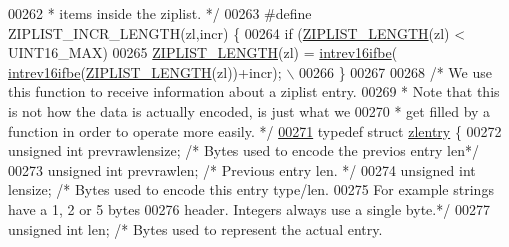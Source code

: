 \begin{DoxyCode}
00262 \textcolor{comment}{ * items inside the ziplist. */}
00263 \textcolor{preprocessor}{#}\textcolor{preprocessor}{define} \textcolor{preprocessor}{ZIPLIST\_INCR\_LENGTH}\textcolor{preprocessor}{(}\textcolor{preprocessor}{zl}\textcolor{preprocessor}{,}\textcolor{preprocessor}{incr}\textcolor{preprocessor}{)} \textcolor{preprocessor}{\{}
00264     \textcolor{keywordflow}{if} \textcolor{preprocessor}{(}\hyperlink{ziplist_8c_a6d779e84aca736e354768fcf87393b98}{ZIPLIST\_LENGTH}\textcolor{preprocessor}{(}\textcolor{preprocessor}{zl}\textcolor{preprocessor}{)} \textcolor{preprocessor}{<} UINT16\_MAX\textcolor{preprocessor}{)}
00265         \hyperlink{ziplist_8c_a6d779e84aca736e354768fcf87393b98}{ZIPLIST\_LENGTH}\textcolor{preprocessor}{(}\textcolor{preprocessor}{zl}\textcolor{preprocessor}{)} \textcolor{preprocessor}{=} \hyperlink{endianconv_8h_a47540b5867d4cb1e322e83eaf2b50b56}{intrev16ifbe}\textcolor{preprocessor}{(}
      \hyperlink{endianconv_8h_a47540b5867d4cb1e322e83eaf2b50b56}{intrev16ifbe}\textcolor{preprocessor}{(}\hyperlink{ziplist_8c_a6d779e84aca736e354768fcf87393b98}{ZIPLIST\_LENGTH}\textcolor{preprocessor}{(}\textcolor{preprocessor}{zl}\textcolor{preprocessor}{)}\textcolor{preprocessor}{)}\textcolor{preprocessor}{+}\textcolor{preprocessor}{incr}\textcolor{preprocessor}{)}\textcolor{preprocessor}{;} \textcolor{preprocessor}{\(\backslash\)}
00266 \textcolor{preprocessor}{\}}
00267 
00268 \textcolor{comment}{/* We use this function to receive information about a ziplist entry.}
00269 \textcolor{comment}{ * Note that this is not how the data is actually encoded, is just what we}
00270 \textcolor{comment}{ * get filled by a function in order to operate more easily. */}
\hyperlink{structzlentry}{00271} \textcolor{keyword}{typedef} \textcolor{keyword}{struct} \hyperlink{structzlentry}{zlentry} \{
00272     \textcolor{keywordtype}{unsigned} \textcolor{keywordtype}{int} prevrawlensize; \textcolor{comment}{/* Bytes used to encode the previos entry len*/}
00273     \textcolor{keywordtype}{unsigned} \textcolor{keywordtype}{int} prevrawlen;     \textcolor{comment}{/* Previous entry len. */}
00274     \textcolor{keywordtype}{unsigned} \textcolor{keywordtype}{int} lensize;        \textcolor{comment}{/* Bytes used to encode this entry type/len.}
00275 \textcolor{comment}{                                    For example strings have a 1, 2 or 5 bytes}
00276 \textcolor{comment}{                                    header. Integers always use a single byte.*/}
00277     \textcolor{keywordtype}{unsigned} \textcolor{keywordtype}{int} len;            \textcolor{comment}{/* Bytes used to represent the actual entry.}

\end{DoxyCode}
